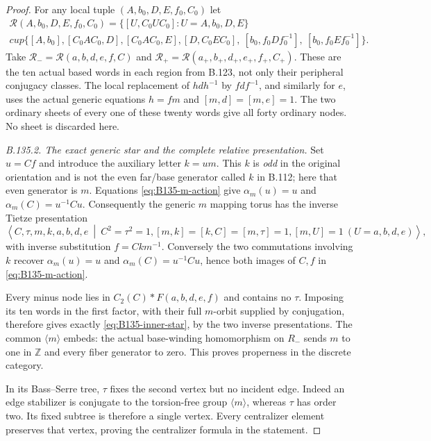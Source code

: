 \begin{proof}
For any local tuple $(A,b_0,D,E,f_0,C_0)$ let
\begin{equation}\label{eq:B135-ten-words}
 \begin{gathered}
 \mathcal R(A,b_0,D,E,f_0,C_0)=
 \bigl\{[U,C_0UC_0]:U=A,b_0,D,E\bigr\}\\
 {}cup\bigl\{[A,b_0],[C_0AC_0,D],[C_0AC_0,E],
 [D,C_0EC_0],\ [b_0,f_0Df_0^{-1}],\ [b_0,f_0Ef_0^{-1}]\bigr\}.
 \end{gathered}
\end{equation}
Take $\mathcal R_- =\mathcal R(a,b,d,e,f,C)$ and
$\mathcal R_+=\mathcal R(a_+,b_+,d_+,e_+,f_+,C_+)$.
These are the ten actual based words in each region from B.123,
not only their peripheral conjugacy classes. The local replacement
of $hdh^{-1}$ by $fdf^{-1}$, and similarly for $e$, uses the
actual generic equations $h=fm$ and $[m,d]=[m,e]=1$.
The two ordinary sheets of every one of these twenty words
give all forty ordinary nodes. No sheet is discarded here.

\emph{B.135.2. The exact generic star and the complete relative presentation.}
Set $u=Cf$ and introduce the auxiliary letter $k=um$.
This $k$ is \emph{odd} in the original orientation and is not
the even far/base generator called $k$ in B.112; here that
even generator is $m$.
Equations \eqref{eq:B135-m-action} give $\alpha_m(u)=u$ and
$\alpha_m(C)=u^{-1}Cu$. Consequently the generic $m$ mapping
torus has the inverse Tietze presentation
\begin{equation}\label{eq:B135-graph-star}
 \left\langle C,\tau,m,k,a,b,d,e\ \middle|\
 C^2=\tau^2=1, [m,k]=[k,C]=[m,\tau]=1,
 [m,U]=1\ (U=a,b,d,e)\right\rangle,
\end{equation}
with inverse substitution $f=Ckm^{-1}$.
Conversely the two commutations involving $k$ recover
$\alpha_m(u)=u$ and $\alpha_m(C)=u^{-1}Cu$, hence both
images of $C,f$ in \eqref{eq:B135-m-action}.

Every minus node lies in $C_2(C)*F(a,b,d,e,f)$ and contains
no $\tau$. Imposing its ten words in the first factor, with
their full $m$-orbit supplied by conjugation, therefore gives
exactly \eqref{eq:B135-inner-star}, by the two inverse
presentations. The common $\langle m\rangle$ embeds: the
actual base-winding homomorphism on $R_-$ sends $m$ to one
in $\mathbb Z$ and every fiber generator to zero.
This proves properness in the discrete category.

In its Bass--Serre tree, $\tau$ fixes the second vertex but
no incident edge. Indeed an edge stabilizer is conjugate to
the torsion-free group $\langle m\rangle$, whereas $\tau$
has order two. Its fixed subtree is therefore a single vertex.
Every centralizer element preserves that vertex, proving the
centralizer formula in the statement.


\end{proof}
